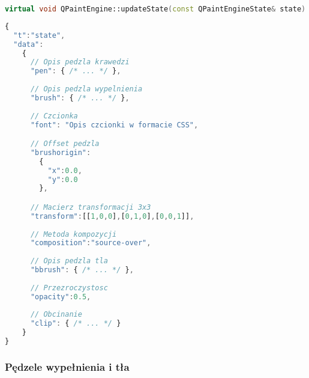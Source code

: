 \begin{lstlisting}[language=C++,numbers=none]
virtual void QPaintEngine::updateState(const QPaintEngineState& state)
\end{lstlisting}
\begin{lstlisting}[language=JavaScript,numbers=none]
{
  "t":"state",
  "data":
    {
      // Opis pedzla krawedzi
      "pen": { /* ... */ },
      
      // Opis pedzla wypelnienia 
      "brush": { /* ... */ },
      
      // Czcionka
      "font": "Opis czcionki w formacie CSS",

      // Offset pedzla
      "brushorigin":
        {
          "x":0.0,
          "y":0.0
        },

      // Macierz transformacji 3x3
      "transform":[[1,0,0],[0,1,0],[0,0,1]], 
      
      // Metoda kompozycji
      "composition":"source-over",
      
      // Opis pedzla tla
      "bbrush": { /* ... */ },
      
      // Przezroczystosc
      "opacity":0.5,
      
      // Obcinanie
      "clip": { /* ... */ }
    }
}
\end{lstlisting}

\subsubsection{Pędzele wypełnienia i tła}

